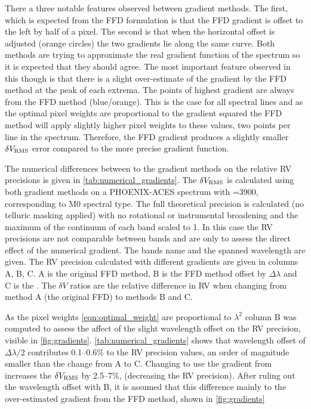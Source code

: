 There a three notable features observed between gradient methods.
The first, which is expected from the {FFD} formulation is that the {FFD} gradient is offset to the left by half of a pixel.
The second is that when the horizontal offset is adjusted (orange circles) the two gradients lie along the same curve.
Both methods are trying to approximate the real gradient function of the spectrum so it is expected that they should agree.
The most important feature observed in this though is that there is a slight over-estimate of the gradient by the {FFD} method at the peak of each extrema.
The points of highest gradient are always from the {FFD} method (blue/orange).
This is the case for all spectral lines and as the optimal pixel weights are proportional to the gradient squared the {FFD} method will apply slightly higher pixel weights to these values, two points per line in the spectrum.
Therefore, the {FFD} gradient produces a slightly smaller \(\delta V_{\textrm{RMS}}\) error compared to the more precise gradient function.

The numerical differences between to the gradient methods on the relative RV precisions is given in \cref{tab:numerical_gradients}.
The \(\delta V_{\textrm{RMS}}\) is calculated using both gradient methods on a {PHOENIX-ACES} spectrum with \Teff{}=3900\K{}, corresponding to {{M0}} spectral type.
The full theoretical precision is calculated (no telluric masking applied) with no rotational or instrumental broadening and the maximum of the continuum of each band scaled to 1.
In this case the {RV} precisions are not comparable between bands and are only to assess the direct effect of the numerical gradient.
The bands name and the spanned wavelength are given.
The {RV} precision calculated with different gradients are given in columns A, B, C.
A is the original {FFD} method, B is the {FFD} method offset by \(\Delta\lambda\) and C is the \npgradient{}.
The \(\delta V\) ratios are the relative difference in {RV} when changing from method A (the original {FFD}) to methods B and C.

As the pixel weights \cref{eqn:optimal_weight} are proportional to \({\lambda}^{2}\) column B was computed to assess the affect of the slight wavelength offset on the {RV} precision, visible in \cref{fig:gradients}.
\cref{tab:numerical_gradients} shows that wavelength offset of \(\Delta\lambda/2\) contributes 0.1--0.6\% to the RV precision values, an order of magnitude smaller than the change from A to C.
Changing to use the gradient from \numpy{} increases the \(\delta V_{\textrm{RMS}}\) by 2.5--7\%, (decreasing the {RV} precision).
After ruling out the wavelength offset with B, it is assumed that this difference mainly to the over-estimated gradient from the {FFD} method, shown in \cref{fig:gradients}


